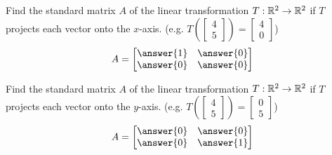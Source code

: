 \documentclass{ximera}
\begin{document}
  \begin{problem}\label{prob:standardmatrix3} Find the standard matrix $A$ of the linear transformation $T:\mathbb{R}^2\rightarrow\mathbb{R}^2$ if
  $T$ projects each vector onto the $x$-axis. (e.g. $T\left(\begin{bmatrix}4\\5\end{bmatrix}\right)=\begin{bmatrix}4\\0\end{bmatrix}$)
    $$A=\begin{bmatrix}\answer{1}&\answer{0}\\\answer{0}&\answer{0}\end{bmatrix}$$
  \end{problem}
  
  \begin{problem}\label{prob:standardmatrix4} Find the standard matrix $A$ of the linear transformation $T:\mathbb{R}^2\rightarrow\mathbb{R}^2$ if
  $T$ projects each vector onto the $y$-axis. (e.g. $T\left(\begin{bmatrix}4\\5\end{bmatrix}\right)=\begin{bmatrix}0\\5\end{bmatrix}$)
    $$A=\begin{bmatrix}\answer{0}&\answer{0}\\\answer{0}&\answer{1}\end{bmatrix}$$
 \end{problem}

 
\end{document}
